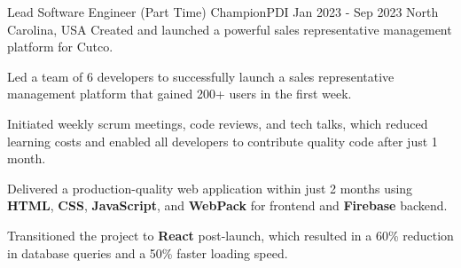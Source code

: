 
\begin{cventries}
  \cventry
    {Lead Software Engineer (Part Time)} %
    {ChampionPDI} %
    {Jan 2023 - Sep 2023} %
    {North Carolina, USA} %
    {Created and launched a powerful sales representative management platform for Cutco.}
    {
      \begin{cvitems} %
        \item {Led a team of 6 developers to successfully launch a sales representative management platform that gained 200+ users in the first week.}
        \item {Initiated weekly scrum meetings, code reviews, and tech talks, which reduced learning costs and enabled all developers to contribute quality code after just 1 month.}
        \item {Delivered a production-quality web application within just 2 months using \textbf{HTML}, \textbf{CSS}, \textbf{JavaScript}, and \textbf{WebPack} for frontend and \textbf{Firebase} backend.}
        \item {Transitioned the project to \textbf{React} post-launch, which resulted in a 60\% reduction in database queries and a 50\% faster loading speed.}
      \end{cvitems}
    }


\end{cventries}
